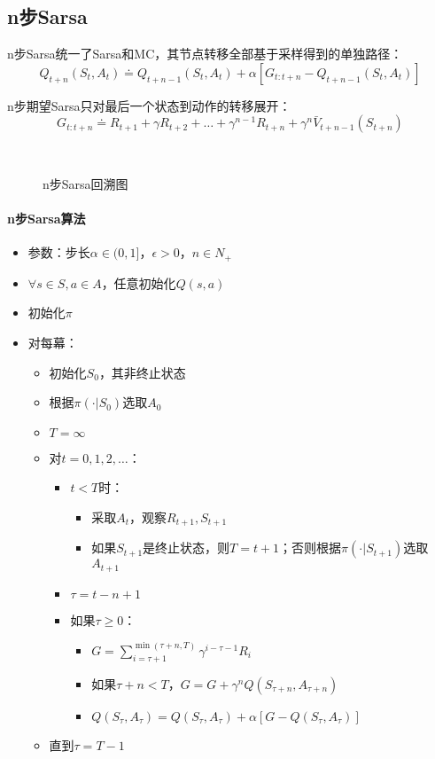\documentclass[
12pt, %
a4paper, 
oneside, %
headinclude,footinclude, %
]{scrartcl}
\begin{document}
\subsection{n步Sarsa}
n步Sarsa统一了Sarsa和MC，其节点转移全部基于采样得到的单独路径：
$$ Q_{t + n}(S_t, A_t) \doteq Q_{t + n - 1}(S_t, A_t) + \alpha [G_{t:t + n} - Q_{t + n - 1}(S_t, A_t)] $$

n步期望Sarsa只对最后一个状态到动作的转移展开：
$$ G_{t:t + n} \doteq R_{t + 1} + \gamma R_{t + 2} + \dots + \gamma^{n - 1} R_{t + n} + \gamma^n \bar{V}_{t + n - 1}(S_{t + n}) $$

\begin{figure}[H]
\centering
{} \\
\caption[n步Sarsa回溯图]{n步Sarsa回溯图}
\end{figure}
\paragraph{n步Sarsa算法}
\begin{itemize}
\item 参数：步长$ \alpha \in (0,1] $，$ \epsilon > 0 $，$ n \in N_+ $
\item $ \forall s \in S, a \in A $，任意初始化$ Q(s, a) $
\item 初始化$ \pi $
\item 对每幕：
\begin{itemize}
\item 初始化$ S_0 $，其非终止状态
\item 根据$ \pi(\cdot|S_0) $选取$ A_0 $
\item $ T = \infty $
\item 对$ t = 0, 1, 2, \dots $：
\begin{itemize}
\item $ t < T $时：
\begin{itemize}
\item 采取$ A_t $，观察$ R_{t + 1}, S_{t + 1} $
\item 如果$ S_{t + 1} $是终止状态，则$ T = t + 1 $；否则根据$ \pi(\cdot|S_{t + 1}) $选取$ A_{t + 1} $
\end{itemize}
\item $ \tau = t - n + 1 $
\item 如果$ \tau \geq 0 $：
\begin{itemize}
\item $ G = \sum_{i = \tau + 1}^{\min(\tau + n, T)} \gamma^{i - \tau - 1}R_i $
\item 如果$ \tau + n < T $，$ G = G + \gamma^n Q(S_{\tau + n}, A_{\tau + n}) $
\item $ Q(S_{\tau},A_{\tau}) = Q(S_{\tau},A_{\tau}) + \alpha[G - Q(S_{\tau},A_{\tau})] $
\end{itemize}
\end{itemize}
\item 直到$ \tau = T - 1 $
\end{itemize}
\end{itemize}
\end{document}
